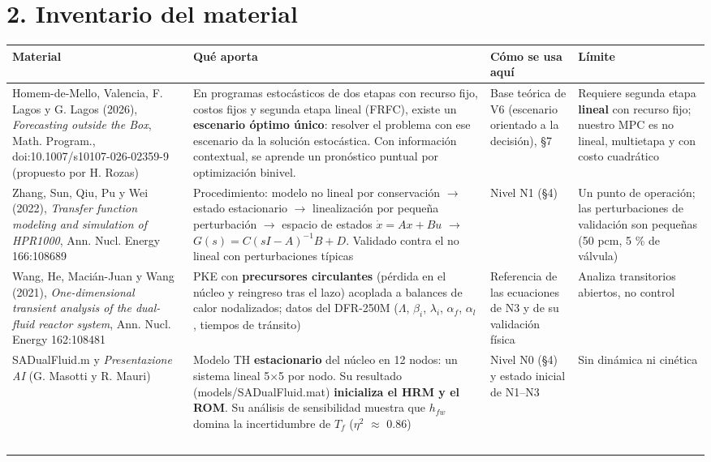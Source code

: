 \documentclass[11pt,a4paper]{article}
\newcommand{\codeus}{\textunderscore\allowbreak}
\newcommand{\code}[1]{{\small\ttfamily\let\_\codeus #1}}
\begin{document}
\section*{2. Inventario del material}
{\footnotesize
\begin{xltabular}{\linewidth}{@{}YYYY@{}}
\toprule
\textbf{Material} & \textbf{Qué aporta} & \textbf{Cómo se usa aquí} & \textbf{Límite} \\
\midrule
\endhead
Homem-de-Mello, Valencia, F. Lagos y G. Lagos (2026), \emph{Forecasting outside the Box}, Math. Program., doi:10.1007/s10107-026-02359-9 (propuesto por H. Rozas) & En programas estocásticos de dos etapas con recurso fijo, costos fijos y segunda etapa lineal (FRFC), existe un \textbf{escenario óptimo único}: resolver el problema con ese escenario da la solución estocástica. Con información contextual, se aprende un pronóstico puntual por optimización binivel. & Base teórica de V6 (escenario orientado a la decisión), \S{}7 & Requiere segunda etapa \textbf{lineal} con recurso fijo; nuestro MPC es no lineal, multietapa y con costo cuadrático \\
Zhang, Sun, Qiu, Pu y Wei (2022), \emph{Transfer function modeling and simulation of HPR1000}, Ann. Nucl. Energy 166:108689 & Procedimiento: modelo no lineal por conservación $\to$ estado estacionario $\to$ linealización por pequeña perturbación $\to$ espacio de estados $\dot x=Ax+Bu$ $\to$ $G(s)=C(sI-A)^{-1}B+D$. Validado contra el no lineal con perturbaciones típicas & Nivel N1 (\S{}4) & Un punto de operación; las perturbaciones de validación son pequeñas (50 pcm, 5 \% de válvula) \\
Wang, He, Macián-Juan y Wang (2021), \emph{One-dimensional transient analysis of the dual-fluid reactor system}, Ann. Nucl. Energy 162:108481 & PKE con \textbf{precursores circulantes} (pérdida en el núcleo y reingreso tras el lazo) acoplada a balances de calor nodalizados; datos del DFR-250M ($\Lambda$, $\beta _{i}$, $\lambda _{i}$, $\alpha _{f}$, $\alpha _{l}$, tiempos de tránsito) & Referencia de las ecuaciones de N3 y de su validación física & Analiza transitorios abiertos, no control \\
\code{SA\_DualFluid.m} y \emph{Presentazione AI} (G. Masotti y R. Mauri) & Modelo TH \textbf{estacionario} del núcleo en 12 nodos: un sistema lineal 5$\times$5 por nodo. Su resultado (\code{models/SA\_DualFluid.mat}) \textbf{inicializa el HRM y el ROM}. Su análisis de sensibilidad muestra que $h_{fw}$ domina la incertidumbre de $T_f$ ($\eta$$^{2}$ $\approx$ 0.86) & Nivel N0 (\S{}4) y estado inicial de N1–N3 & Sin dinámica ni cinética \\
$$
\end{xltabular}}
\end{document}
